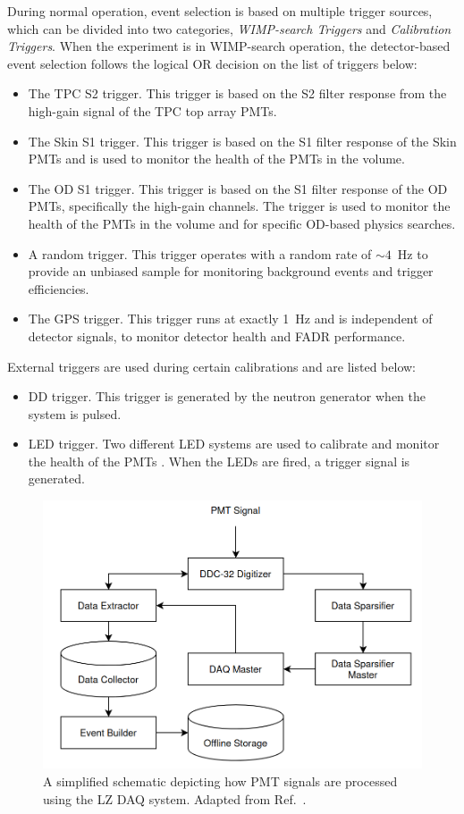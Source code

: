 During normal operation, event selection is based on multiple trigger sources, which can be divided into two categories, \textit{WIMP-search Triggers} and \textit{Calibration Triggers}. When the experiment is in WIMP-search operation, the detector-based event selection follows the logical OR decision on the list of triggers below:
\begin{itemize}
    \item The TPC S2 trigger. This trigger is based on the S2 filter response from the high-gain signal of the TPC top array PMTs.
    \item The Skin S1 trigger. This trigger is based on the S1 filter response of the Skin PMTs and is used to monitor the health of the PMTs in the volume.
    \item The OD S1 trigger. This trigger is based on the S1 filter response of the OD PMTs, specifically the high-gain channels. The trigger is used to monitor the health of the PMTs in the volume and for specific OD-based physics searches.
    \item A random trigger. This trigger operates with a random rate of $\sim4$~Hz to provide an unbiased sample for monitoring background events and trigger efficiencies. 
    \item The GPS trigger. This trigger runs at exactly 1~Hz and is independent of detector signals, to monitor detector health and FADR performance. 
\end{itemize}
External triggers are used during certain calibrations and are listed below:
\begin{itemize}
    \item DD trigger. This trigger is generated by the neutron generator when the system is pulsed.
    \item LED trigger. Two different LED systems are used to calibrate and monitor the health of the PMTs \cite{LZ:2024bsz}. When the LEDs are fired, a trigger signal is generated.
\end{itemize}
\begin{figure}[!ht]
    \centering
    \includegraphics[width=0.7\linewidth]{figures/LZ/LZDAQ.png}
    \caption[A simplified schematic depicting how PMT signals are processed using the LZ DAQ system.]{A simplified schematic depicting how PMT signals are processed using the LZ DAQ system. Adapted from Ref.~\cite{LZ:2024bvw}.}
    \label{fig:LZ/LZDAQ}
\end{figure}
